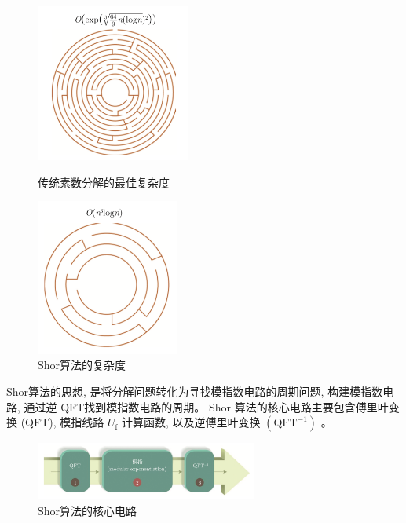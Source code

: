 \documentclass[12pt,hyperref,a4paper,UTF8]{ctexart}
\begin{document}
\begin{figure}[!htbp]
	\begin{minipage}{0.5\linewidth}
		\centering
		\includegraphics[width=2in]{figures/传统素数分解.png}
		\caption{传统素数分解的最佳复杂度}
	\end{minipage}
	\begin{minipage}{0.5\linewidth}
		\centering
		\includegraphics[width=1.85in]{figures/Shor算法分解.png}
		\caption{Shor算法的复杂度}
	\end{minipage}
\end{figure}

Shor算法的思想, 是将分解问题转化为寻找模指数电路的周期问题, 构建模指数电路, 通过逆 QFT找到模指数电路的周期。
Shor 算法的核心电路主要包含傅里叶变换 (QFT), 模指线路 $U_{\mathrm{f}}$ 计算函数, 以及逆傅里叶变换 $\left(\mathrm{QFT}^{-1}\right)$ 。

\begin{figure}[!htbp]     
    \centering     
    \includegraphics[width =0.65\textwidth]{figures/Shor算法的核心电路.png}     
    \caption{Shor算法的核心电路}
\end{figure}
\end{document}
